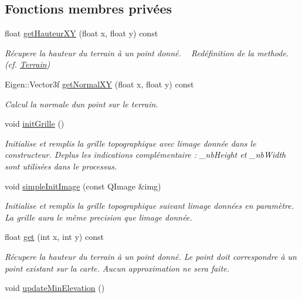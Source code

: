 \subsection*{Fonctions membres privées}
\begin{DoxyCompactItemize}
\item 
float \hyperlink{class_terrain_tab_a076546e6958b6b2edd94366976e21c78}{get\+Hauteur\+X\+Y} (float x, float y) const 
\begin{DoxyCompactList}\small\item\em Récupere la hauteur du terrain à un point donné. ~\newline
Redéfinition de la methode. (cf. \hyperlink{class_terrain}{Terrain}) \end{DoxyCompactList}\item 
Eigen\+::\+Vector3f \hyperlink{class_terrain_tab_aaf94ed8b78c53bb798f7879c9249f3b3}{get\+Normal\+X\+Y} (float x, float y) const 
\begin{DoxyCompactList}\small\item\em Calcul la normale d\textquotesingle{}un point sur le terrain. \end{DoxyCompactList}\item 
\hypertarget{class_terrain_tab_a6d4a9f721bcea94798b66d24a6ce065f}{}void \hyperlink{class_terrain_tab_a6d4a9f721bcea94798b66d24a6ce065f}{init\+Grille} ()\label{class_terrain_tab_a6d4a9f721bcea94798b66d24a6ce065f}

\begin{DoxyCompactList}\small\item\em Initialise et remplis la grille topographique avec l\textquotesingle{}image donnée dans le constructeur. Deplus les indications complémentaire \+: \+\_\+nb\+Height et \+\_\+nb\+Width sont utilisées dans le processus. \end{DoxyCompactList}\item 
void \hyperlink{class_terrain_tab_a1e83068235cd90e879667fc3c1b6c8d0}{simple\+Init\+Image} (const Q\+Image \&img)
\begin{DoxyCompactList}\small\item\em Initialise et remplis la grille topographique suivant l\textquotesingle{}image données en paramètre. La grille aura le même precision que l\textquotesingle{}image donnée. \end{DoxyCompactList}\item 
float \hyperlink{class_terrain_tab_ac004fb257c99905c71303d819c9b8df7}{get} (int x, int y) const 
\begin{DoxyCompactList}\small\item\em Récupere la hauteur du terrain à un point donné. Le point doit correspondre à un point existant sur la carte. Aucun approximation ne sera faite. \end{DoxyCompactList}\item 
\hypertarget{class_terrain_tab_a1e534af1daceb931f558245d8b584084}{}void \hyperlink{class_terrain_tab_a1e534af1daceb931f558245d8b584084}{update\+Min\+Elevation} ()\label{class_terrain_tab_a1e534af1daceb931f558245d8b584084}


\end{DoxyCompactItemize}
